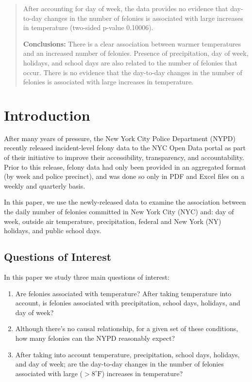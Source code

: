 \documentclass[11pt,notitlepage]{article}
\newcommand{\degf}{^\circ\text{F}}
\begin{document}
\begin{abstract}
After accounting for day of week, the data provides no evidence that day-to-day changes in the number of felonies is associated with large increases in temperature (two-sided p-value 0.10006).

\noindent \textbf{Conclusions:} There is a clear association between warmer temperatures and an increased number of felonies. Presence of precipitation, day of week, holidays, and school days are also related to the number of felonies that occur. There is no evidence that the day-to-day changes in the number of felonies is associated with large increases in temperature.




\end{abstract}





\section{Introduction}



After many years of pressure, the New York City Police Department (NYPD) recently released incident-level felony data to the NYC Open Data portal as part of their initiative to improve their accessibility, transparency, and accountability. Prior to this release, felony data had only been provided in an aggregated format (by week and police precinct), and was done so only in PDF and Excel files on a weekly and quarterly basis.

In this paper, we use the newly-released data to examine the association between the daily number of felonies committed in New York City (NYC) and: day of week, outside air temperature, precipitation, federal and New York (NY) holidays, and public school days.

\subsection{Questions of Interest}

In this paper we study three main questions of interest:

\begin{enumerate}
\setlength\itemsep{-3pt}
\vspace*{-3mm}

\item Are felonies associated with temperature? After taking temperature into account, is felonies associated with precipitation, school days, holidays, and day of week?
\item Although there's no causal relationship, for a given set of these conditions, how many felonies can the NYPD reasonably expect?
\item After taking into account temperature, precipitation, school days, holidays, and day of week; are the day-to-day changes in the number of felonies associated with large ($>8 \degf$) increases in temperature?
\end{enumerate}
\end{document}
